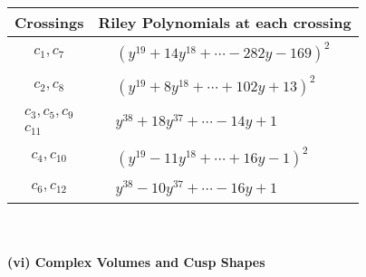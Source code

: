\documentclass[1p]{elsarticle_modified}
\theoremstyle{definition}
\begin{document}
\begin{tabular}{m{50pt}|m{274pt}}
Crossings & \hspace{64pt}Riley Polynomials at each crossing \\
\hline $$\begin{aligned}c_{1},c_{7}\end{aligned}$$&$\begin{aligned}
&(y^{19}+14 y^{18}+\cdots-282 y-169)^{2}
\end{aligned}$\\
\hline $$\begin{aligned}c_{2},c_{8}\end{aligned}$$&$\begin{aligned}
&(y^{19}+8 y^{18}+\cdots+102 y+13)^{2}
\end{aligned}$\\
\hline $$\begin{aligned}c_{3},c_{5},c_{9}\\c_{11}\end{aligned}$$&$\begin{aligned}
&y^{38}+18 y^{37}+\cdots-14 y+1
\end{aligned}$\\
\hline $$\begin{aligned}c_{4},c_{10}\end{aligned}$$&$\begin{aligned}
&(y^{19}-11 y^{18}+\cdots+16 y-1)^{2}
\end{aligned}$\\
\hline $$\begin{aligned}c_{6},c_{12}\end{aligned}$$&$\begin{aligned}
&y^{38}-10 y^{37}+\cdots-16 y+1
\end{aligned}$\\
\hline
\end{tabular}\\~\\
\newpage\flushleft \textbf{(vi) Complex Volumes and Cusp Shapes}
\end{document}
